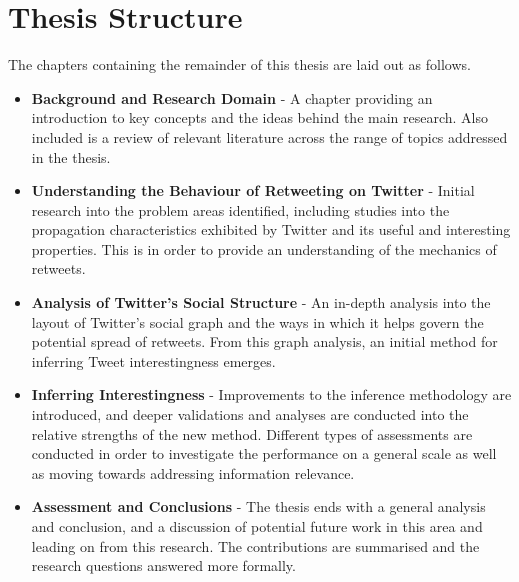 \section{Thesis Structure}
The chapters containing the remainder of this thesis are laid out as follows.

\begin{itemize}
    \item \textbf{Background and Research Domain} - A chapter providing an introduction to key concepts and the ideas behind the main research. Also included is a review of relevant literature across the range of topics addressed in the thesis.
    \item \textbf{Understanding the Behaviour of Retweeting on Twitter} - Initial research into the problem areas identified, including studies into the propagation characteristics exhibited by Twitter and its useful and interesting properties. This is in order to provide an understanding of the mechanics of retweets.
    \item \textbf{Analysis of Twitter's Social Structure} - An in-depth analysis into the layout of Twitter's social graph and the ways in which it helps govern the potential spread of retweets. From this graph analysis, an initial method for inferring Tweet interestingness emerges.
    \item \textbf{Inferring Interestingness} - Improvements to the inference methodology are introduced, and deeper validations and analyses are conducted into the relative strengths of the new method. Different types of assessments are conducted in order to investigate the performance on a general scale as well as moving towards addressing information relevance.
    \item \textbf{Assessment and Conclusions} - The thesis ends with a general analysis and conclusion, and a discussion of potential future work in this area and leading on from this research. The contributions are summarised and the research questions answered more formally.
\end{itemize}
